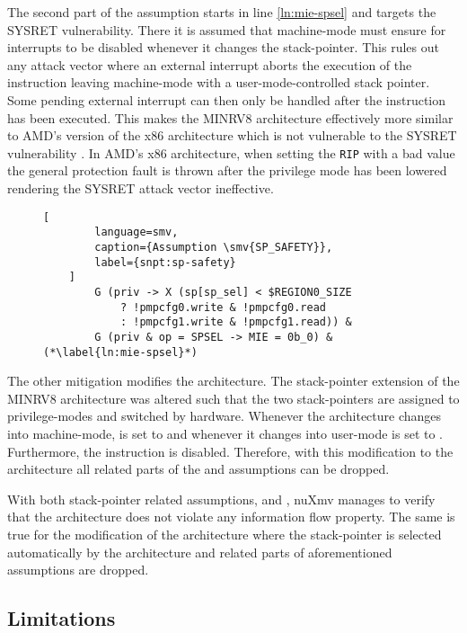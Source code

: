 The second part of the assumption starts in line \ref{ln:mie-spsel} and targets the SYSRET vulnerability.
There it is assumed that machine-mode must ensure for interrupts to be disabled whenever it changes the stack-pointer.
This rules out any attack vector where an external interrupt aborts the execution of the  instruction leaving machine-mode with a user-mode-controlled stack pointer.
Some pending external interrupt can then only be handled after the  instruction has been executed.
This makes the MINRV8 architecture effectively more similar to AMD's version of the x86 architecture which is not vulnerable to the SYSRET vulnerability \cite{Dunlap19}.
In AMD's x86 architecture, when setting the \lstinline{RIP} with a bad value the general protection fault is thrown after the privilege mode has been lowered rendering the SYSRET attack vector ineffective.

\begin{figure}
    \begin{lstlisting}[
        language=smv,
        caption={Assumption \smv{SP_SAFETY}},
        label={snpt:sp-safety}
    ]
        G (priv -> X (sp[sp_sel] < $REGION0_SIZE
            ? !pmpcfg0.write & !pmpcfg0.read
            : !pmpcfg1.write & !pmpcfg1.read)) &
        G (priv & op = SPSEL -> MIE = 0b_0) & (*\label{ln:mie-spsel}*)
    \end{lstlisting}
\end{figure}

The other mitigation modifies the architecture.
The stack-pointer extension of the MINRV8 architecture was altered such that the two stack-pointers are assigned to privilege-modes and switched by hardware.
Whenever the architecture changes into machine-mode,  is set to  and whenever it changes into user-mode  is set to .
Furthermore, the  instruction is disabled.
Therefore, with this modification to the architecture all  related parts of the  and  assumptions can be dropped.

With both stack-pointer related assumptions,  and , nuXmv manages to verify that the architecture does not violate any information flow property.
The same is true for the modification of the architecture where the stack-pointer is selected automatically by the architecture and  related parts of aforementioned assumptions are dropped.

\subsection{Limitations}
